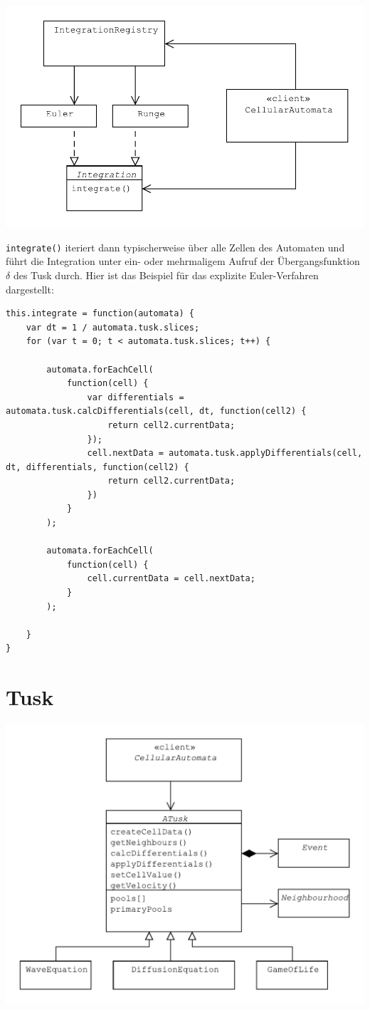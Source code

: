 \documentclass[11pt]{article} %
\theoremstyle{definition}
\begin{document}
\includegraphics[scale=0.7]{uml/Integration.pdf}

{\tt integrate()} iteriert dann typischerweise über alle Zellen des Automaten und führt die Integration unter ein- oder mehrmaligem Aufruf der Übergangsfunktion $\delta$ des Tusk durch. Hier ist das Beispiel für das explizite Euler-Verfahren dargestellt:

\begin{lstlisting}
this.integrate = function(automata) {
	var dt = 1 / automata.tusk.slices;
	for (var t = 0; t < automata.tusk.slices; t++) {
		
		automata.forEachCell(
			function(cell) {
				var differentials = automata.tusk.calcDifferentials(cell, dt, function(cell2) {
					return cell2.currentData;
				});
				cell.nextData = automata.tusk.applyDifferentials(cell, dt, differentials, function(cell2) {
					return cell2.currentData;
				})
			}
		);
		
		automata.forEachCell(
			function(cell) {
				cell.currentData = cell.nextData;
			}
		);
		
	}
}
\end{lstlisting}

\section{Tusk}

\includegraphics[scale=0.7]{uml/Tusk.pdf}
\end{document}
